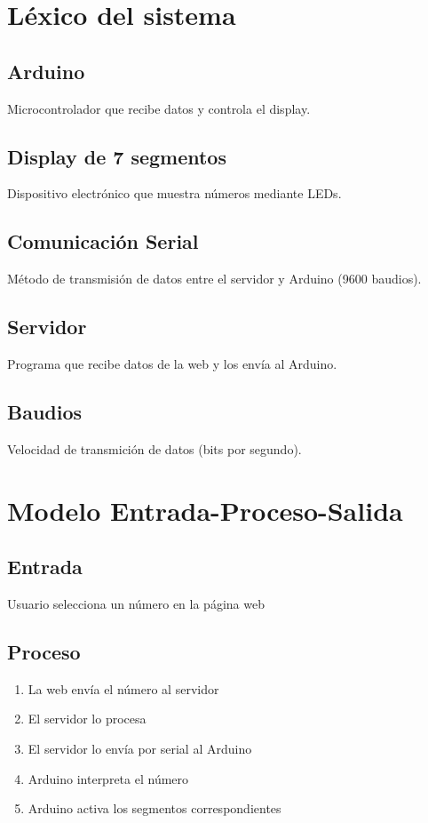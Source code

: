 \documentclass{article}
\begin{document}
\section{Léxico del sistema}
    \subsection{Arduino}
    Microcontrolador que recibe datos y controla el display.

    \subsection{Display de 7 segmentos}
    Dispositivo electrónico que muestra números mediante LEDs.

    \subsection{Comunicación Serial}
    Método de transmisión de datos entre el servidor y Arduino (9600 baudios).

    \subsection{Servidor}
    Programa que recibe datos de la web y los envía al Arduino.

    \subsection{Baudios}
    Velocidad de transmición de datos (bits por segundo).


\section{Modelo Entrada-Proceso-Salida}
    \subsection{Entrada}
    Usuario selecciona un número en la página web

    \subsection{Proceso}
        \begin{enumerate}
            \item La web envía el número al servidor
            \item El servidor lo procesa
            \item El servidor lo envía por serial al Arduino
            \item Arduino interpreta el número
            \item Arduino activa los segmentos correspondientes
        \end{enumerate}
    
\end{document}
